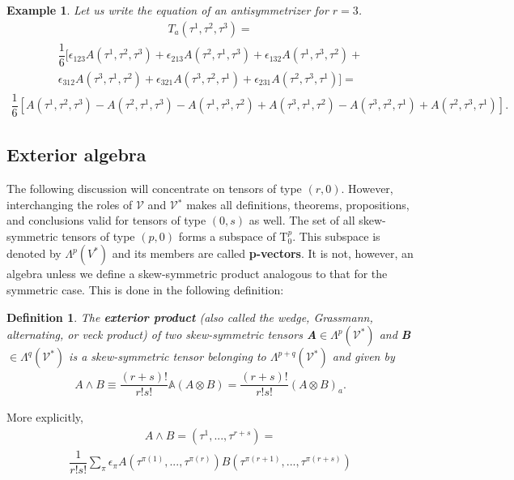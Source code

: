 \documentclass[12pt,a4paper]{article}
\newtheorem{defn}[thm]{Definition}
\newtheorem{exmp}{Example}[section]
\begin{document}
\begin{exmp}
Let us write the equation of an antisymmetrizer for $r = 3$.\\
\begin{align*}
T_a(\tau^1,\tau^2,\tau^3) =
\end{align*}
\begin{align*}
 \dfrac{1}{6} [ \epsilon_{123}A(\tau^1,\tau^2,\tau^3) + \epsilon_{213}A(\tau^2,\tau^1,\tau^3) + \epsilon_{132}A(\tau^1,\tau^3,\tau^2) +\\ \epsilon_{312}A(\tau^3,\tau^1,\tau^2) + \epsilon_{321}A(\tau^3,\tau^2,\tau^1) + \epsilon_{231}A(\tau^2,\tau^3,\tau^1) ] =
 \end{align*}
 \begin{align*}
\dfrac{1}{6} [A(\tau^1,\tau^2,\tau^3)- A(\tau^2,\tau^1,\tau^3)  - A(\tau^1,\tau^3,\tau^2) + A(\tau^3,\tau^1,\tau^2) - A(\tau^3,\tau^2,\tau^1) + A(\tau^2,\tau^3,\tau^1) ].
\end{align*}

\end{exmp}

\subsection{Exterior algebra}
The following discussion will concentrate on tensors of type $(r, 0)$. However, interchanging the roles of $\mathcal{V}$ and $\mathcal{V}$$^*$ makes all definitions, theorems,
propositions, and conclusions valid for tensors of type $(0, s)$ as well. The set of all skew-symmetric tensors of type $(p, 0)$ forms a subspace of T$^{p}_{0}$. This subspace is denoted by $\Lambda^{p}  (V^*)$ and its members are called \textbf{p-vectors}. It is not, however, an algebra unless we define a skew-symmetric
product analogous to that for the symmetric case. This is done in the following definition:
\begin{defn}
The \textbf{exterior product} (also called the wedge, Grassmann, alternating, or veck product) of two skew-symmetric tensors \textbf{A}$\in\Lambda^{p}(\mathcal{V}^*)$ and  \textbf{B}$\in\Lambda^{q}(\mathcal{V}^*)$ is a skew-symmetric tensor belonging to $\Lambda^{p+q}(\mathcal{V}^*)$ and given by
\begin{align*}
A \wedge B \equiv \dfrac{(r+s)!}{r!s!} \mathbb{A} (A \otimes B ) =\dfrac{(r+s)!}{r!s!}(A \otimes B ) _{a}.
\end{align*}
\end{defn}

More explicitly,\\
\begin{align*}
A \wedge B = (\tau^1,...,\tau^{r+s})=
\end{align*}
\begin{align*}	
\dfrac{1}{r!s!}\sum_{\pi}\epsilon_{\pi} A (\tau^{\pi(1)},...,\tau^{\pi(r)})B (\tau^{\pi(r+1)},...,\tau^{\pi(r+s)})
\end{align*}
\end{document}

